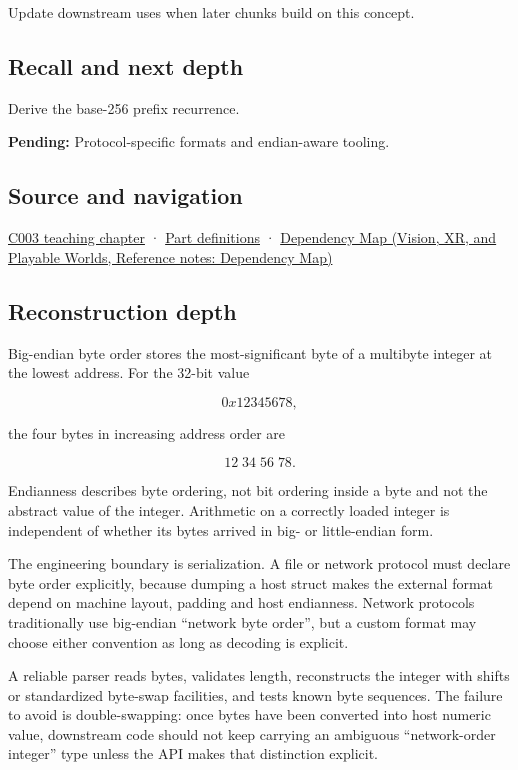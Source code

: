 Update downstream uses when later chunks build on this concept.

\subsection{Recall and next depth}\label{appendix-92e040df969a-recall-and-next-depth}

\hypertarget{appendix-92e040df969a-recall-and-next-depth}{}

Derive the base-256 prefix recurrence.

\textbf{Pending:} Protocol-specific formats and endian-aware tooling.

\subsection{Source and navigation}\label{appendix-92e040df969a-source-and-navigation}

\hypertarget{appendix-92e040df969a-source-and-navigation}{}

\hyperref[01-foundations-i-ch002-where-the-bytes-live]{C003 teaching chapter} · \hyperref[appendix-fd090d982a15-m003---parts-41-60]{Part definitions} · \href{../07-Vision-XR-and-Playable-Worlds/main.pdf\#nameddest=appendix-4ad47bdd269a}{Dependency Map (Vision, XR, and Playable Worlds, Reference notes: Dependency Map)}

\subsection{Reconstruction depth}\label{appendix-92e040df969a-reconstruction-depth}

\hypertarget{appendix-92e040df969a-reconstruction-depth}{}

Big-endian byte order stores the most-significant byte of a multibyte integer at the lowest address. For the 32-bit value

\[
0x12345678,
\]

the four bytes in increasing address order are

\[
12\;34\;56\;78.
\]

Endianness describes byte ordering, not bit ordering inside a byte and not the abstract value of the integer. Arithmetic on a correctly loaded integer is independent of whether its bytes arrived in big- or little-endian form.

The engineering boundary is serialization. A file or network protocol must declare byte order explicitly, because dumping a host struct makes the external format depend on machine layout, padding and host endianness. Network protocols traditionally use big-endian ``network byte order'', but a custom format may choose either convention as long as decoding is explicit.

A reliable parser reads bytes, validates length, reconstructs the integer with shifts or standardized byte-swap facilities, and tests known byte sequences. The failure to avoid is double-swapping: once bytes have been converted into host numeric value, downstream code should not keep carrying an ambiguous ``network-order integer'' type unless the API makes that distinction explicit.
